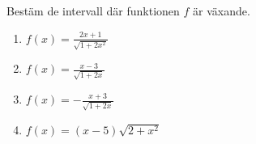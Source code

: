 

Bestäm de intervall där funktionen $f$ är växande.
\begin{enumerate}
\item $ f(x) =  \frac{2x+1}{\sqrt{1+2x^2}} $
\item $ f(x) =  \frac{x-3}{\sqrt{1+2x}} $
\item $ f(x) =  -\frac{x+3}{\sqrt{1+2x}} $
\item $ f(x) =  (x-5)\sqrt{2+x^2} $
\end{enumerate}